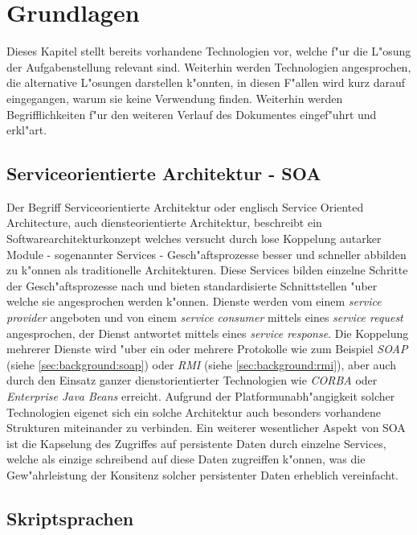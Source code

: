 \chapter{Grundlagen}
\label{sec:background}

Dieses Kapitel stellt bereits vorhandene Technologien vor, welche f"ur die L"osung der Aufgabenstellung relevant sind.
Weiterhin werden Technologien angesprochen, die alternative L"osungen darstellen k"onnten, in diesen F"allen wird kurz
darauf eingegangen, warum sie keine Verwendung finden. Weiterhin werden Begrifflichkeiten f"ur den weiteren Verlauf
des Dokumentes eingef"uhrt und erkl"art.

\section{Serviceorientierte Architektur - SOA}
\label{sec:background:soa}
Der Begriff Serviceorientierte Architektur oder englisch Service Oriented Architecture, auch diensteorientierte Architektur,
beschreibt ein Softwarearchitekturkonzept welches versucht durch lose Koppelung autarker Module - sogenannter Services -
Gesch"aftsprozesse besser und schneller abbilden zu k"onnen als traditionelle Architekturen. Diese Services bilden
einzelne Schritte der Gesch"aftsprozesse nach und bieten standardisierte Schnittstellen "uber welche sie angesprochen
werden k"onnen. Dienste werden vom einem \emph{service provider} angeboten und von einem \emph{service consumer}
mittels eines \emph{service request} angesprochen, der Dienst antwortet mittels eines \emph{service response}.
Die Koppelung mehrerer Dienste wird "uber ein oder mehrere Protokolle wie zum Beispiel \emph{SOAP} (siehe \ref{sec:background:soap})
oder \emph{RMI} (siehe \ref{sec:background:rmi}), aber auch durch den Einsatz ganzer dienstorientierter Technologien
wie \emph{CORBA} oder \emph{Enterprise Java Beans} erreicht. 
Aufgrund der Platformunabh"angigkeit solcher Technologien eigenet sich ein solche Architektur auch besonders vorhandene
Strukturen miteinander zu verbinden.
Ein weiterer wesentlicher Aspekt von SOA ist die Kapselung des Zugriffes
auf persistente Daten durch einzelne Services, welche als einzige schreibend auf diese Daten zugreiffen k"onnen, was 
die Gew"ahrleistung der Konsitenz solcher persistenter Daten erheblich vereinfacht. 

\section{Skriptsprachen}
\label{sec:background:script}

